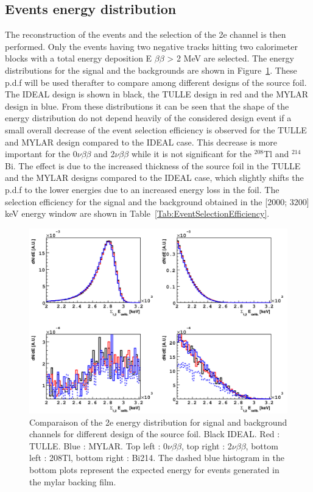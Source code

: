 \documentclass[main.tex]{subfiles}
\begin{document}
\subsection{Events energy distribution}


\NI The reconstruction of the events and the selection of the 2e channel is then performed. Only the events having two negative tracks hitting two calorimeter blocks with a total energy deposition E $\beta\beta$ > 2 MeV are selected. The energy distributions for the signal and the backgrounds are shown in Figure~\ref{Distribution2eSelection}. These p.d.f will be used therafter to compare among different designs of the source foil. The IDEAL design is shown in black, the TULLE design in red and the MYLAR design in blue. From these distributions it can be seen that the shape of the energy distribution do not depend heavily of the considered design event if a small overall decrease of the event selection efficiency is observed for the TULLE and MYLAR design compared to the IDEAL case. This decrease is more important for the 0$\nu\beta\beta$ and 2$\nu\beta\beta$ while it is not significant for the $^{\text{208}}$Tl and $^{\text{214}}$Bi. The effect is due to the increased thickness of the source foil in the TULLE and the MYLAR designs compared to the IDEAL case, which slightly shifts the p.d.f to the lower energies due to an increased energy loss in the foil. The selection efficiency for the signal and the background obtained in the [2000; 3200] keV energy window are shown in Table~\ref{Tab:EventSelectionEfficiency}.


\begin{figure}[h!]
\centering
\includegraphics[scale=0.24]{pictures/Chap4/Distribution2eSelection.png}
\caption{Comparaison of the 2e energy distribution for signal and background channels for different design of the source foil. Black IDEAL. Red : TULLE. Blue : MYLAR. Top left : 0$\nu\beta\beta$, top right : 2$\nu\beta\beta$, bottom left : 208Tl, bottom right : Bi214. The dashed blue histogram in the bottom plots represent the expected energy for events generated in the mylar backing film.}
\label{Distribution2eSelection}
\end{figure}
\end{document}
